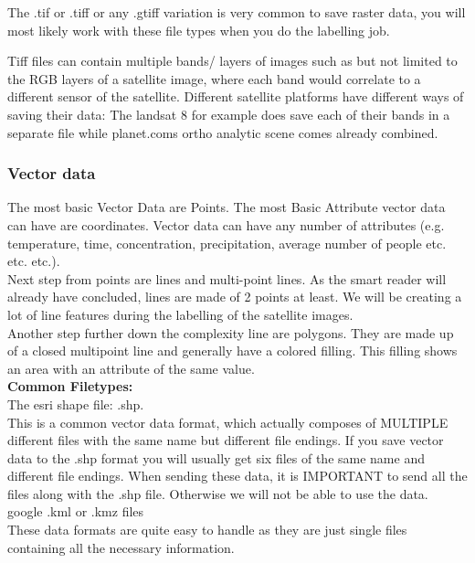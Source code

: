 \documentclass[12pt,a4paper]{scrartcl}
\begin{document}
The .tif or .tiff or any .gtiff variation is very common to save raster data, you will most likely work with these file types when you do the labelling job.  

Tiff files can contain multiple bands/ layers of images such as but not limited to the RGB layers of a satellite image,
where each band would correlate to a different sensor of the satellite.
Different satellite platforms have different ways of saving their data: 
The landsat 8 for example does save each of their bands in a separate file while planet.coms ortho analytic scene comes already combined. 

\subsubsection{Vector data}

The most basic Vector Data are Points. The most Basic Attribute vector data can have are coordinates. 
Vector data can have any number of attributes (e.g. temperature, time, concentration, precipitation, average number of people etc. etc. etc.). \\

Next step from points are lines and multi-point lines.
As the smart reader will already have concluded, lines are made of 2 points at least.
We will be creating a lot of line features during the labelling of the satellite images.\\

Another step further down the complexity line are polygons. 
They are made up of a closed multipoint line and generally have a colored filling.
This filling shows an area with an attribute of the same value. \\

\textbf{Common Filetypes:}\\

The esri shape file: .shp. \\
This is a common vector data format, which actually composes of MULTIPLE different files with the same name but different file endings.
If you save vector data to the .shp format you will usually get six files of the same name and different file endings.
When sending these data, it is IMPORTANT to send all the files along with the .shp file. 
Otherwise we will not be able to use the data.\\

google .kml or .kmz files \\
These data formats are quite easy to handle as they are just single files containing all the necessary information.
\end{document}
